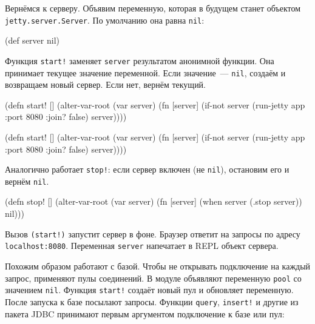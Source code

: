 Вернёмся к серверу. Объявим переменную, которая в будущем станет объектом
\texttt{jetty.server\-.Server}. По умолчанию она равна \verb|nil|:

\begin{english}
  \begin{clojure}
(def server nil)
  \end{clojure}
\end{english}

Функция \verb|start!| заменяет \verb|server| результатом анонимной функции. Она
принимает текущее значение переменной. Если значение~--- \verb|nil|, создаём и
возвращаем новый сервер. Если нет, вернём текущий.

\ifnarrow

\begin{english}
  \begin{clojure}
(defn start! []
  (alter-var-root
   (var server)
   (fn [server]
     (if-not server
       (run-jetty app {:port 8080
                       :join? false})
       server))))
  \end{clojure}
\end{english}

\else

\begin{english}
  \begin{clojure}
(defn start! []
  (alter-var-root (var server)
    (fn [server]
      (if-not server
        (run-jetty app {:port 8080 :join? false})
        server))))
  \end{clojure}
\end{english}

\fi

\noindent
Аналогично работает \verb|stop!|: если сервер включен (не \verb|nil|),
остановим его и вернём \verb|nil|.

\begin{english}
  \begin{clojure}
(defn stop! []
  (alter-var-root
    (var server)
    (fn [server]
      (when server
        (.stop server))
      nil)))
  \end{clojure}
\end{english}

Вызов \verb|(start!)| запустит сервер в фоне. Браузер ответит на запросы по
адресу \texttt{localhost\-:8080}. Переменная \verb|server| напечатает в REPL
объект сервера.


Похожим образом работают с базой. Чтобы не открывать подключение на каждый
запрос, применяют пулы соединений. В модуле объявляют переменную \verb|pool| со
значением \verb|nil|. Функция \verb|start!| создаёт новый пул и обновляет
переменную. После запуска к базе посылают запросы. Функции \verb|query|,
\verb|insert!| и другие из пакета JDBC принимают первым аргументом подключение к
базе или пул:

